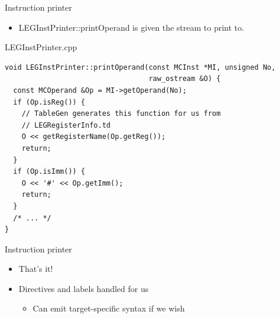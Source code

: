 
\begin{frame}[fragile]{Instruction printer}

\begin{itemize}
    \item LEGInstPrinter::printOperand is given the stream to print to.
\end{itemize}

\begin{block}{LEGInstPrinter.cpp}
\begin{lstlisting}
void LEGInstPrinter::printOperand(const MCInst *MI, unsigned No,
                                  raw_ostream &O) {
  const MCOperand &Op = MI->getOperand(No);
  if (Op.isReg()) {
    // TableGen generates this function for us from   
    // LEGRegisterInfo.td
    O << getRegisterName(Op.getReg());
    return;
  }
  if (Op.isImm()) {
    O << '#' << Op.getImm();
    return;
  }
  /* ... */
}
\end{lstlisting}
\end{block}

\end{frame}


\begin{frame}{Instruction printer}

\begin{itemize}
    \item That's it!
    \item Directives and labels handled for us
    \begin{itemize}
        \item Can emit target-specific syntax if we wish
    \end{itemize}
\end{itemize}


\end{frame}
